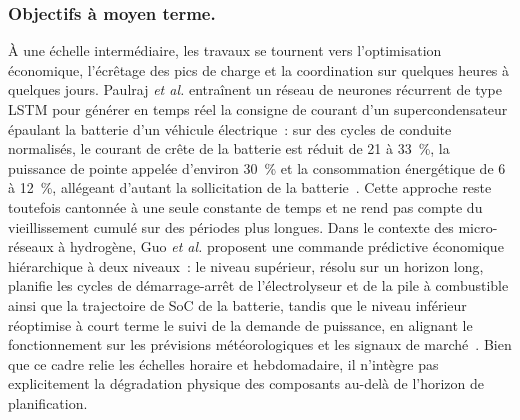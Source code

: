 \subsubsection{Objectifs à moyen terme.}
À une échelle intermédiaire, les travaux se tournent vers l'optimisation économique, l'écrêtage des pics de charge et la coordination sur quelques heures à quelques jours.
Paulraj \textit{et al.} entraînent un réseau de neurones récurrent de type LSTM pour générer en temps réel la consigne de courant d'un supercondensateur épaulant la batterie d'un véhicule électrique~: sur des cycles de conduite normalisés, le courant de crête de la batterie est réduit de 21 à 33~\%, la puissance de pointe appelée d'environ 30~\% et la consommation énergétique de 6 à 12~\%, allégeant d'autant la sollicitation de la batterie~\cite{paulraj_machine_2025}.
Cette approche reste toutefois cantonnée à une seule constante de temps et ne rend pas compte du vieillissement cumulé sur des périodes plus longues.
Dans le contexte des micro-réseaux à hydrogène, Guo \textit{et al.} proposent une commande prédictive économique hiérarchique à deux niveaux~: le niveau supérieur, résolu sur un horizon long, planifie les cycles de démarrage-arrêt de l'électrolyseur et de la pile à combustible ainsi que la trajectoire de SoC de la batterie, tandis que le niveau inférieur réoptimise à court terme le suivi de la demande de puissance, en alignant le fonctionnement sur les prévisions météorologiques et les signaux de marché~\cite{guo_sustainable_2025}.
Bien que ce cadre relie les échelles horaire et hebdomadaire, il n'intègre pas explicitement la dégradation physique des composants au-delà de l'horizon de planification.

